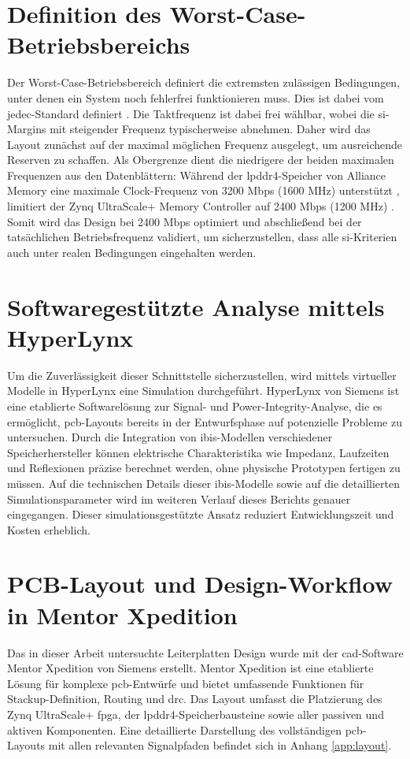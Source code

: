 \section{Definition des Worst-Case-Betriebsbereichs}
Der Worst-Case-Betriebsbereich definiert die extremsten zulässigen Bedingungen, unter denen ein System noch fehlerfrei funktionieren muss. Dies ist dabei vom \gls{jedec}-Standard definiert \cite{siemens_ddr_sim}. Die Taktfrequenz ist dabei frei wählbar, wobei die \gls{si}-Margins mit steigender Frequenz typischerweise abnehmen. Daher wird das Layout zunächst auf der maximal möglichen Frequenz ausgelegt, um ausreichende Reserven zu schaffen.
Als Obergrenze dient die niedrigere der beiden maximalen Frequenzen aus den Datenblättern: Während der \gls{lpddr4}-Speicher von Alliance Memory eine maximale Clock-Frequenz von 3200 Mbps (1600 MHz) unterstützt \cite{alliance_lpddr4_ds}, limitiert der Zynq UltraScale+ Memory Controller auf 2400 Mbps (1200 MHz) \cite{xilinx_zynq_ds}. Somit wird das Design bei 2400 Mbps optimiert und abschließend bei der tatsächlichen Betriebsfrequenz validiert, um sicherzustellen, dass alle \gls{si}-Kriterien auch unter realen Bedingungen eingehalten werden.

\section{Softwaregestützte Analyse mittels HyperLynx}
Um die Zuverlässigkeit dieser Schnittstelle sicherzustellen, wird mittels virtueller Modelle in HyperLynx eine Simulation durchgeführt. HyperLynx von Siemens ist eine etablierte Softwarelösung zur Signal- und Power-Integrity-Analyse, die es ermöglicht, \gls{pcb}-Layouts bereits in der Entwurfsphase auf potenzielle Probleme zu untersuchen. Durch die Integration von \gls{ibis}-Modellen verschiedener Speicherhersteller können elektrische Charakteristika wie Impedanz, Laufzeiten und Reflexionen präzise berechnet werden, ohne physische Prototypen fertigen zu müssen. Auf die technischen Details dieser \gls{ibis}-Modelle sowie auf die detaillierten Simulationsparameter wird im weiteren Verlauf dieses Berichts genauer eingegangen. Dieser simulationsgestützte Ansatz reduziert Entwicklungszeit und Kosten erheblich.

\section{PCB-Layout und Design-Workflow in Mentor Xpedition}
Das in dieser Arbeit untersuchte Leiterplatten Design wurde mit der \gls{cad}-Software Mentor Xpedition von Siemens erstellt. Mentor Xpedition ist eine etablierte Lösung für komplexe \gls{pcb}-Entwürfe und bietet umfassende Funktionen für Stackup-Definition, Routing und \gls{drc}. Das Layout umfasst die Platzierung des Zynq UltraScale+ \gls{fpga}, der \gls{lpddr4}-Speicherbausteine sowie aller passiven und aktiven Komponenten. Eine detaillierte Darstellung des vollständigen \gls{pcb}-Layouts mit allen relevanten Signalpfaden befindet sich in Anhang \ref{app:layout}.

